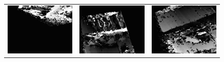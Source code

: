 \documentclass[11pt]{report}
\begin{document}
\begin{figure}[H]
  \centering
  \begin{tabular}{ccc}
    \includegraphics[scale=0.1]{images/disparity-opencv-t/disparity_0.png} &
    \includegraphics[scale=0.1]{images/disparity-opencv-d/disparity_0.png} &
    \includegraphics[scale=0.1]{images/disparity-opengv/disparity_0.png} \\

\end{tabular}
\end{figure}
\end{document}
